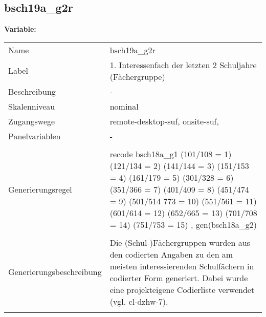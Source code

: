 	
	
	\subsection{bsch19a\_g2r}
	\label{subSection:bsch19a_g2r}

	\noindent\textbf{Variable:}\\
		\begin{tabular}{lL{11.3cm}}
			\label{tableVariable:bsch19a_g2r}
			Name & bsch19a\_g2r \\
			Label & 1. Interessenfach der letzten 2 Schuljahre (Fächergruppe) \\
			Beschreibung & - \\
			Skalenniveau & nominal \\
			Zugangswege &
				remote-desktop-suf,
				onsite-suf,
 \\
			Panelvariablen & -
			 \\
			 \\
					Generierungsregel & recode bsch18a\_g1 (101/108 = 1) (121/134 = 2) (141/144 = 3) 
(151/153 = 4) (161/179 = 5) (301/328 = 6) (351/366 = 7) 
(401/409 = 8) (451/474 = 9) (501/514 773 = 10) (551/561 = 11) 
(601/614 = 12) (652/665 = 13) (701/708 = 14) (751/753 = 15)
, gen(bsch18a\_g2) \\
				 \\
					Generierungsbeschreibung & Die (Schul-)Fächergruppen wurden aus den codierten Angaben zu den am meisten interessierenden Schulfächern in codierter Form generiert. Dabei wurde eine projekteigene Codierliste verwendet (vgl. cl-dzhw-7).
				 \\	
			 \\
		\end{tabular}






